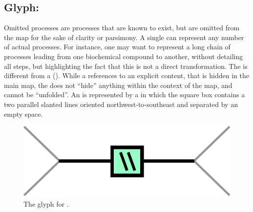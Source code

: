 \subsection{Glyph: }\label{sec:omitted}

Omitted processes are processes that are known to exist, but are omitted from the map for the sake of clarity or parsimony. A single  can represent any number of actual processes. For instance, one may want to represent a long chain of processes leading from one biochemical compound to another, without detailing all steps, but highlighting the fact that this is not a direct transformation.  The  is different from a  (). While a  references to an explicit content, that is hidden in the main map, the  does not ``hide'' anything within the context of the map, and cannot be ``unfolded''. An  is represented by a  in which the square box contains a two parallel slanted lines oriented northwest-to-southeast and separated by an empty space.

\begin{figure}[H]
  \centering
  \includegraphics[scale = 0.5]{images/omitted}
  \caption{The \PD glyph for .}
  \label{fig:omitted}
\end{figure}



